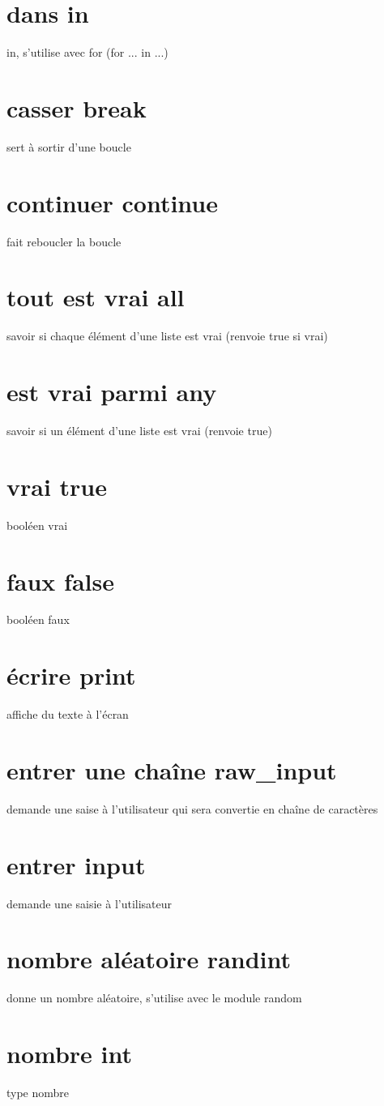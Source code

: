 \documentclass{book}
\begin{document}
\section{dans in }
  in, s'utilise avec for (for ... in ...)
\section{casser break }
  sert à sortir d'une boucle
\section{continuer continue }
  fait reboucler la boucle
\section{tout est vrai all }
  savoir si chaque élément d'une liste est vrai (renvoie true si vrai) 
\section{est vrai parmi any }
  savoir si un élément d'une liste est vrai (renvoie true)
\section{vrai true }
  booléen vrai
\section{faux false }
  booléen faux
\section{écrire print }
  affiche du texte à l'écran
\section{entrer une chaîne raw\_input }
  demande une saise à l'utilisateur qui sera convertie en chaîne de caractères
\section{entrer input }
  demande une saisie à l'utilisateur
\section{nombre aléatoire randint }
  donne un nombre aléatoire, s'utilise avec le module random
\section{nombre int }
  type nombre
\end{document}
